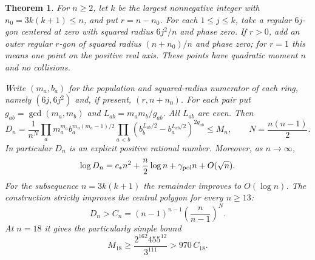 \documentclass[11pt]{article}
\newtheorem{theorem}{Theorem}[section]
\theoremstyle{remark}
\numberwithin{equation}{section}
\begin{document}
\begin{theorem}\label{thm:polar-all-n}
For $n\ge2$, let $k$ be the largest nonnegative integer with
$n_0=3k(k+1)\le n$, and put $r=n-n_0$.
For each $1\le j\le k$, take a regular $6j$-gon centered at zero
with squared radius $6j^2/n$ and phase zero.  If $r>0$, add an
outer regular $r$-gon of squared radius $(n+n_0)/n$ and phase zero;
for $r=1$ this means one point on the positive real axis.
These points have quadratic moment $n$ and no collisions.

Write $(m_a,b_a)$ for the population and squared-radius numerator
of each ring, namely $(6j,6j^2)$ and, if present, $(r,n+n_0)$.
For each pair put $g_{ab}=\gcd(m_a,m_b)$ and
$L_{ab}=m_am_b/g_{ab}$.  All $L_{ab}$ are even.  Then
\begin{equation}\label{eq:polar-rational-all-n}
 D_n=\frac1{n^N}
 \prod_a m_a^{m_a}b_a^{m_a(m_a-1)/2}
 \prod_{a<b}(b_b^{L_{ab}/2}-b_a^{L_{ab}/2})^{2g_{ab}}
 \le M_n,\qquad N=\frac{n(n-1)}2.
\end{equation}
In particular $D_n$ is an explicit positive rational number.
Moreover, as $n\to\infty$,
\begin{equation}\label{eq:polar-three-term}
 \log D_n=c_*n^2+\frac n2\log n+\gamma_{\rm pol}n+O(\sqrt n).
\end{equation}
For the subsequence $n=3k(k+1)$ the remainder improves to
$O(\log n)$.
The construction strictly improves the central polygon for every
$n\ge13$:
\[
 D_n>C_n=(n-1)^{n-1}\left(\frac n{n-1}\right)^N.
\]
At $n=18$ it gives the particularly simple bound
\begin{equation}\label{eq:polar-eighteen}
 M_{18}\ge\frac{2^{162}455^{12}}{3^{111}}>970\,C_{18}.
\end{equation}
\end{theorem}
\end{document}
